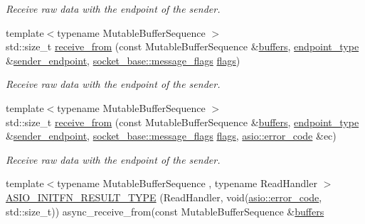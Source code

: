 \begin{DoxyCompactItemize}
\begin{DoxyCompactList}\small\item\em Receive raw data with the endpoint of the sender. \end{DoxyCompactList}\item 
{\footnotesize template$<$typename Mutable\+Buffer\+Sequence $>$ }\\std\+::size\+\_\+t \hyperlink{classasio_1_1basic__raw__socket_a658a6a43e6be8b664f4abcd4dad01105}{receive\+\_\+from} (const Mutable\+Buffer\+Sequence \&\hyperlink{group__async__read_ga54dede45c3175148a77fe6635222c47d}{buffers}, \hyperlink{classasio_1_1basic__raw__socket_a75803815223ab2cbfa66c51a650236b5}{endpoint\+\_\+type} \&\hyperlink{classasio_1_1basic__raw__socket_aa2e1f2e9f86892704225b64abe99c528}{sender\+\_\+endpoint}, \hyperlink{classasio_1_1socket__base_ac3cf77465dfedfe1979b5415cf32cc94}{socket\+\_\+base\+::message\+\_\+flags} \hyperlink{classasio_1_1basic__raw__socket_a324289af06e6526b244c1074db009c3f}{flags})
\begin{DoxyCompactList}\small\item\em Receive raw data with the endpoint of the sender. \end{DoxyCompactList}\item 
{\footnotesize template$<$typename Mutable\+Buffer\+Sequence $>$ }\\std\+::size\+\_\+t \hyperlink{classasio_1_1basic__raw__socket_acf1f7e57acdab31a53c7bf0197d2c820}{receive\+\_\+from} (const Mutable\+Buffer\+Sequence \&\hyperlink{group__async__read_ga54dede45c3175148a77fe6635222c47d}{buffers}, \hyperlink{classasio_1_1basic__raw__socket_a75803815223ab2cbfa66c51a650236b5}{endpoint\+\_\+type} \&\hyperlink{classasio_1_1basic__raw__socket_aa2e1f2e9f86892704225b64abe99c528}{sender\+\_\+endpoint}, \hyperlink{classasio_1_1socket__base_ac3cf77465dfedfe1979b5415cf32cc94}{socket\+\_\+base\+::message\+\_\+flags} \hyperlink{classasio_1_1basic__raw__socket_a324289af06e6526b244c1074db009c3f}{flags}, \hyperlink{classasio_1_1error__code}{asio\+::error\+\_\+code} \&ec)
\begin{DoxyCompactList}\small\item\em Receive raw data with the endpoint of the sender. \end{DoxyCompactList}\item 
{\footnotesize template$<$typename Mutable\+Buffer\+Sequence , typename Read\+Handler $>$ }\\\hyperlink{classasio_1_1basic__raw__socket_a1b5b0944e7c349bd2c282497c4aa2bd5}{A\+S\+I\+O\+\_\+\+I\+N\+I\+T\+F\+N\+\_\+\+R\+E\+S\+U\+L\+T\+\_\+\+T\+Y\+P\+E} (Read\+Handler, void(\hyperlink{classasio_1_1error__code}{asio\+::error\+\_\+code}, std\+::size\+\_\+t)) async\+\_\+receive\+\_\+from(const Mutable\+Buffer\+Sequence \&\hyperlink{group__async__read_ga54dede45c3175148a77fe6635222c47d}{buffers}

\end{DoxyCompactItemize}

